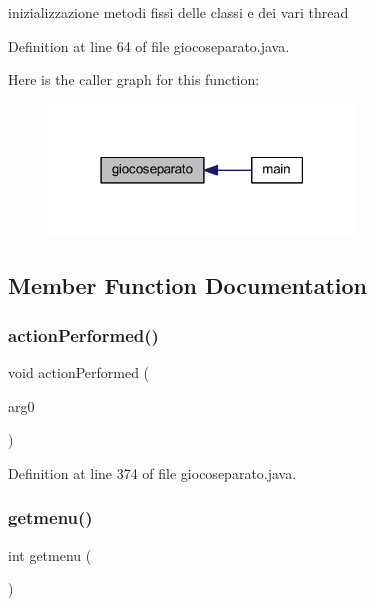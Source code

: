 inizializzazione metodi fissi delle classi e dei vari thread

Definition at line 64 of file giocoseparato.\+java.

Here is the caller graph for this function\+:
\nopagebreak
\begin{figure}[H]
\begin{center}
\leavevmode
\includegraphics[width=231pt]{classcargame_1_1giocoseparato_ae3a253caf075ef5655f9a36ef21b6852_icgraph}
\end{center}
\end{figure}


\subsection{Member Function Documentation}
\mbox{\label{classcargame_1_1giocoseparato_a7945fb750f69bc1a51968d0cd563cc16}} 
\subsubsection{\texorpdfstring{action\+Performed()}{actionPerformed()}}
{\footnotesize\ttfamily void action\+Performed (\begin{DoxyParamCaption}\item[{Action\+Event}]{arg0 }\end{DoxyParamCaption})}



Definition at line 374 of file giocoseparato.\+java.

\mbox{\label{classcargame_1_1giocoseparato_ac9a2698ad12494cd463a2aa2cceb8b2e}} 
\subsubsection{\texorpdfstring{getmenu()}{getmenu()}}
{\footnotesize\ttfamily int getmenu (\begin{DoxyParamCaption}{ }\end{DoxyParamCaption})}



